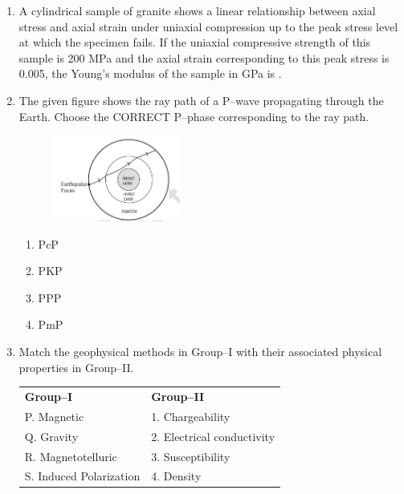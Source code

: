 \documentclass[journal,12pt,onecolumn]{IEEEtran}
\begin{document}
\begin{enumerate}
\item A cylindrical sample of granite  shows a linear relationship between axial stress and axial strain under uniaxial compression up to the peak stress level at which the specimen fails. If the uniaxial compressive strength of this sample is 200 MPa and the axial strain corresponding to this peak stress is 0.005, the Young’s modulus of the sample in GPa is \underline{\hspace{1.5cm}} .

\hfill{}




\item The given figure shows the ray path of a P–wave propagating through the Earth. Choose the CORRECT P–phase corresponding to the ray path.
\begin{figure}[h!]
    \centering
    \includegraphics[width=0.4\textwidth]{figs/fig4.png}
    \caption{}
    \label{fig:q18}
\end{figure}


\hfill{}

\begin{multicols}{4}
\begin{enumerate}
    \item PcP
    \item PKP
    \item PPP
    \item PmP
\end{enumerate}
\end{multicols}

\item Match the geophysical methods in Group–I with their associated physical properties in Group–II.
\begin{tabular}{ll}
\textbf{Group–I} & \textbf{Group–II} \\
P. Magnetic & 1. Chargeability \\
Q. Gravity & 2. Electrical conductivity \\
R. Magnetotelluric & 3. Susceptibility \\
S. Induced Polarization & 4. Density \\
\end{tabular}


\end{enumerate}
\end{document}
